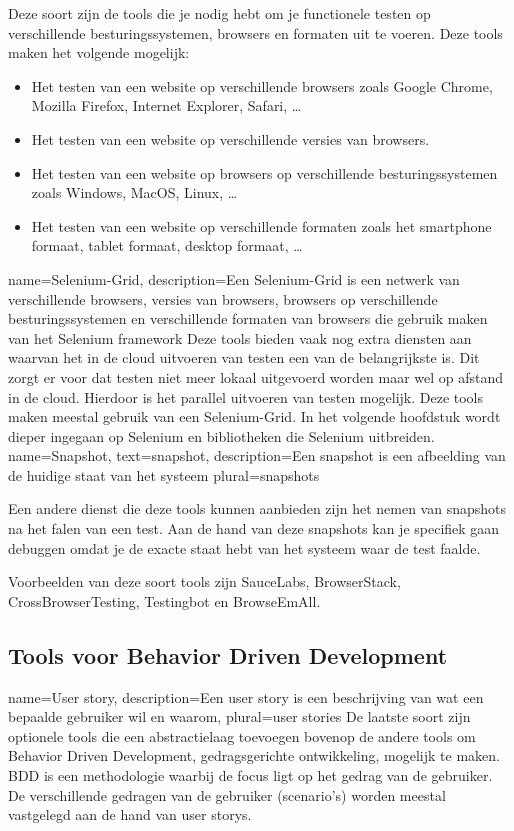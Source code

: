 Deze soort zijn de tools die je nodig hebt om je functionele testen op verschillende besturingssystemen, browsers en formaten uit te voeren. Deze tools maken het volgende mogelijk: 
\begin{itemize}
\item Het testen van een website op verschillende browsers zoals Google Chrome, Mozilla Firefox, Internet Explorer, Safari, \ldots
\item Het testen van een website op verschillende versies van browsers.
\item Het testen van een website op browsers op verschillende besturingssystemen zoals Windows, MacOS, Linux, \ldots
\item Het testen van een website op verschillende formaten zoals het smartphone formaat, tablet formaat, desktop formaat, \ldots
\end{itemize}
{
    name=Selenium-Grid,
    description={Een Selenium-Grid is een netwerk van verschillende browsers, versies van browsers, browsers op verschillende besturingssystemen en verschillende formaten van browsers die gebruik maken van het Selenium framework}
}
Deze tools bieden vaak nog extra diensten aan waarvan het in de cloud uitvoeren van testen een van de belangrijkste is. Dit zorgt er voor dat testen niet meer lokaal uitgevoerd worden maar wel op afstand in de cloud. Hierdoor is het parallel uitvoeren van testen mogelijk. Deze tools maken meestal gebruik van een \gls{Selenium-Grid}. In het volgende hoofdstuk wordt dieper ingegaan op Selenium en bibliotheken die Selenium uitbreiden.
{
    name=Snapshot,
    text=snapshot,
    description={Een snapshot is een afbeelding van de huidige staat van het systeem}
    plural={snapshots}
}

Een andere dienst die deze tools kunnen aanbieden zijn het nemen van \glspl{snapshot} na het falen van een test. Aan de hand van deze snapshots kan je specifiek gaan debuggen omdat je de exacte staat hebt van het systeem waar de test faalde.

Voorbeelden van deze soort tools zijn SauceLabs, BrowserStack, CrossBrowserTesting, Testingbot en BrowseEmAll.

\subsection{Tools voor Behavior Driven Development}
{
    name=User story,
    description={Een user story is een beschrijving van wat een bepaalde gebruiker wil en waarom},
    plural={user stories}
}
De laatste soort zijn optionele tools die een abstractielaag toevoegen bovenop de andere tools om Behavior Driven Development, gedragsgerichte ontwikkeling, mogelijk te maken. \gls{BDD} is een methodologie waarbij de focus ligt op het gedrag van de gebruiker. De verschillende gedragen van de gebruiker (scenario's)  worden meestal vastgelegd aan de hand van \glspl{user story}.


